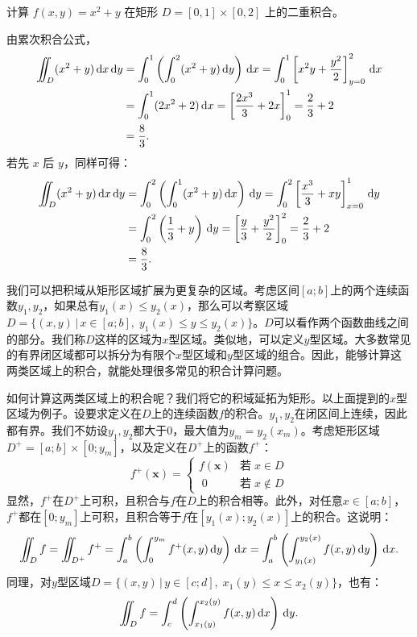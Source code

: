 \documentclass[12pt,UTF8,fontset=none]{ctexbook}
\begin{document}
\begin{et}
    计算 $f(x,y)=x^2+y$ 在矩形 $D=[0,1]\times[0,2]$ 上的二重积合。
\end{et}
\begin{so}
    由累次积合公式，
    \begin{align*}
         \int\!\!\!\!\!\int_D (x^2+y) \,\mathrm{d}x\,\mathrm{d}y &= \int_0^1 \left( \int_0^2 (x^2+y) \,\mathrm{d}y \right) \,\mathrm{d}x = \int_0^1 \left[ x^2 y + \frac{y^2}{2} \right]_{y=0}^{2} \,\mathrm{d}x \\
         &= \int_0^1 (2x^2+2) \,\mathrm{d}x = \left[ \frac{2x^3}{3}+2x \right]_0^1 = \frac{2}{3}+2 \\
         &= \frac{8}{3}.
    \end{align*}
    若先 $x$ 后 $y$，同样可得：
    \begin{align*}
        \int\!\!\!\!\!\int_D (x^2+y) \,\mathrm{d}x\,\mathrm{d}y &= \int_0^2 \left( \int_0^1 (x^2+y) \,\mathrm{d}x \right) \,\mathrm{d}y = \int_0^2 \left[ \frac{x^3}{3}+xy \right]_{x=0}^{1} \,\mathrm{d}y \\
        &= \int_0^2 \left( \frac{1}{3}+y \right) \,\mathrm{d}y = \left[ \frac{y}{3}+\frac{y^2}{2} \right]_0^2 = \frac{2}{3}+2 \\
        &= \frac{8}{3}.
    \end{align*}
\end{so}

我们可以把积域从矩形区域扩展为更复杂的区域。考虑区间$[a;b]$上的两个连续函数$y_1,y_2$，如果总有$y_1(x)\leqslant y_2(x)$，那么可以考察区域$D = \{(x,y)\,|\,x\in[a;b],\;y_1(x)\leqslant y\leqslant y_2(x)\}$。$D$可以看作两个函数曲线之间的部分。我们称$D$这样的区域为$x$\dash 型区域。类似地，可以定义$y$\dash 型区域。大多数常见的有界闭区域都可以拆分为有限个$x$\dash 型区域和$y$\dash 型区域的组合。因此，能够计算这两类区域上的积合，就能处理很多常见的积合计算问题。

如何计算这两类区域上的积合呢？我们将它的积域延拓为矩形。以上面提到的$x$\dash 型区域为例子。设要求定义在$D$上的连续函数$f$的积合。$y_1,y_2$在闭区间上连续，因此都有界。我们不妨设$y_1,y_2$都大于$0$，最大值为$y_m=y_2(x_m)$。考虑矩形区域$D^+=[a;b]\times[0;y_m]$，以及定义在$D^+$上的函数$f^+$：
$$
f^+(\mathbf{x}) = \begin{cases}
    f(\mathbf{x}) & \mbox{若}\;x\in D\\
    \;0 &  \mbox{若}\;x\notin D
\end{cases}
$$
显然，$f^+$在$D^+$上可积，且积合与$f$在$D$上的积合相等。此外，对任意$x\in[a;b]$，$f^+$都在$[0;y_m]$上可积，且积合等于$f$在$[y_1(x);y_2(x)]$上的积合。这说明：
$$ \jii_{D} f = \jii_{D^+} f^+ = \int_{a}^b \left(\int_{0}^{y_m} f^+(x,y)\di{y}\right)\di{x} = \int_{a}^b \left(\int_{y_1(x)}^{y_2(x)} f(x,y)\di{y}\right)\di{x}. $$
同理，对$y$\dash 型区域$D = \{(x,y)\,|\,y\in[c;d],\;x_1(y)\leqslant x\leqslant x_2(y)\}$，也有：
$$ \int\!\!\!\!\!\int_{D} f = \int_{c}^d \left(\int_{x_1(y)}^{x_2(y)} f(x,y)\,\mathrm{d}x\right)\,\mathrm{d}y. $$
\end{document}
